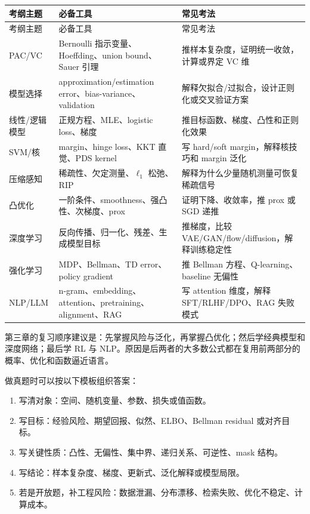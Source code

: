 \documentclass[11pt]{ctexart}
\begin{document}
\begin{longtable}{L{0.24\textwidth}L{0.34\textwidth}L{0.34\textwidth}}
\toprule
考纲主题 & 必备工具 & 常见考法 \\
\midrule
\endfirsthead
\toprule
考纲主题 & 必备工具 & 常见考法 \\
\midrule
\endhead
PAC/VC & Bernoulli 指示变量、Hoeffding、union bound、Sauer 引理 & 推样本复杂度，证明统一收敛，计算或界定 VC 维 \\
模型选择 & approximation/estimation error、bias-variance、validation & 解释欠拟合/过拟合，设计正则化或交叉验证方案 \\
线性/逻辑模型 & 正规方程、MLE、logistic loss、梯度 & 推目标函数、梯度、凸性和正则化效果 \\
SVM/核 & margin、hinge loss、KKT 直觉、PDS kernel & 写 hard/soft margin，解释核技巧和 margin 泛化 \\
压缩感知 & 稀疏性、欠定测量、\(\ell_1\) 松弛、RIP & 解释为什么少量随机测量可恢复稀疏信号 \\
凸优化 & 一阶条件、smoothness、强凸性、次梯度、prox & 证明下降、收敛率，推 prox 或 SGD 递推 \\
深度学习 & 反向传播、归一化、残差、生成模型目标 & 推梯度，比较 VAE/GAN/flow/diffusion，解释训练稳定性 \\
强化学习 & MDP、Bellman、TD error、policy gradient & 推 Bellman 方程、Q-learning、baseline 无偏性 \\
NLP/LLM & n-gram、embedding、attention、pretraining、alignment、RAG & 写 attention 维度，解释 SFT/RLHF/DPO、RAG 失败模式 \\
\bottomrule
\end{longtable}

\begin{checkpoint}
第三章的复习顺序建议是：先掌握风险与泛化，再掌握凸优化；然后学经典模型和深度网络；最后学 RL 与 NLP。原因是后两者的大多数公式都在复用前两部分的概率、优化和函数逼近语言。
\end{checkpoint}

\begin{examnote}
做真题时可以按以下模板组织答案：
\end{examnote}


\begin{enumerate}
  \item 写清对象：空间、随机变量、参数、损失或值函数。
  \item 写目标：经验风险、期望回报、似然、ELBO、Bellman residual 或对齐目标。
  \item 写关键性质：凸性、无偏性、集中界、递归关系、可逆性、mask 结构。
  \item 写结论：样本复杂度、梯度、更新式、泛化解释或模型局限。
  \item 若是开放题，补工程风险：数据泄漏、分布漂移、检索失败、优化不稳定、计算成本。
\end{enumerate}

\printbibliography[heading=bibintoc,title={参考文献与官方来源}]
\end{document}
